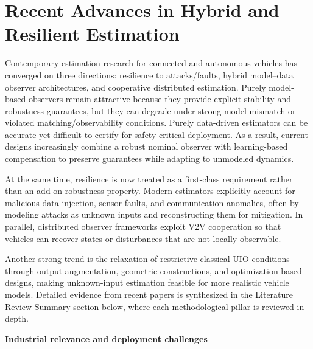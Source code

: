 \section{Recent Advances in Hybrid and Resilient Estimation}
Contemporary estimation research for connected and autonomous vehicles has converged on three directions: resilience to attacks/faults, hybrid model--data observer architectures, and cooperative distributed estimation. Purely model-based observers remain attractive because they provide explicit stability and robustness guarantees, but they can degrade under strong model mismatch or violated matching/observability conditions. Purely data-driven estimators can be accurate yet difficult to certify for safety-critical deployment. As a result, current designs increasingly combine a robust nominal observer with learning-based compensation to preserve guarantees while adapting to unmodeled dynamics.

At the same time, resilience is now treated as a first-class requirement rather than an add-on robustness property. Modern estimators explicitly account for malicious data injection, sensor faults, and communication anomalies, often by modeling attacks as unknown inputs and reconstructing them for mitigation. In parallel, distributed observer frameworks exploit V2V cooperation so that vehicles can recover states or disturbances that are not locally observable.

Another strong trend is the relaxation of restrictive classical UIO conditions through output augmentation, geometric constructions, and optimization-based designs, making unknown-input estimation feasible for more realistic vehicle models. Detailed evidence from recent papers is synthesized in the Literature Review Summary section below, where each methodological pillar is reviewed in depth.

\textbf{Industrial relevance and deployment challenges}

